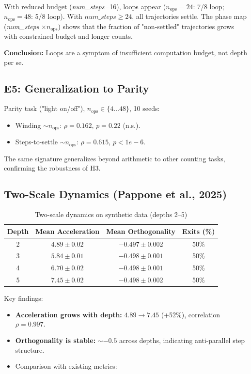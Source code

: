 \documentclass[12pt,a4paper]{article}
\begin{document}
With reduced budget (\textit{num\_steps}=16), loops appear ($n_{\text{ops}}=24$: 7/8 loop; $n_{\text{ops}}=48$: 5/8 loop). With $\textit{num\_steps} \ge 24$, all trajectories settle. The phase map (\textit{num\_steps} $\times n_{\text{ops}}$) shows that the fraction of "non-settled" trajectories grows with constrained budget and longer counts.

\textbf{Conclusion:} Loops are a symptom of insufficient computation budget, not depth per se.

\subsection{E5: Generalization to Parity}

Parity task ("light on/off"), $n_{\text{ops}} \in \{4\ldots 48\}$, 10 seeds:

\begin{itemize}
    \item Winding $\sim n_{\text{ops}}$: $\rho = 0.162$, $p = 0.22$ (n.s.).
    \item Steps-to-settle $\sim n_{\text{ops}}$: $\rho = 0.615$, $p < 1e-6$.
\end{itemize}

The same signature generalizes beyond arithmetic to other counting tasks, confirming the robustness of H3.

\subsection{Two-Scale Dynamics (Pappone et al., 2025)}

\begin{table}[h]
\centering
\caption{Two-scale dynamics on synthetic data (depths 2--5)}
\begin{tabular}{cccc}
\toprule
Depth & Mean Acceleration & Mean Orthogonality & Exits (\%) \\
\midrule
2 & $4.89 \pm 0.02$ & $-0.497 \pm 0.002$ & 50\% \\
3 & $5.84 \pm 0.01$ & $-0.498 \pm 0.001$ & 50\% \\
4 & $6.70 \pm 0.02$ & $-0.498 \pm 0.001$ & 50\% \\
5 & $7.45 \pm 0.02$ & $-0.498 \pm 0.002$ & 50\% \\
\bottomrule
\end{tabular}
\end{table}

Key findings:
\begin{itemize}
    \item \textbf{Acceleration grows with depth:} $4.89 \rightarrow 7.45$ (+52\%), correlation $\rho = 0.997$.
    \item \textbf{Orthogonality is stable:} $\sim -0.5$ across depths, indicating anti-parallel step structure.
    \item Comparison with existing metrics:
\end{itemize}
\end{document}
